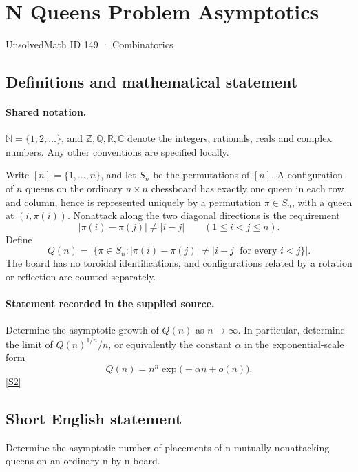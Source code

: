 \documentclass[11pt]{article}
\newcommand{\sref}[2]{\hyperlink{source:#1:#2}{[S#2]}}
\begin{document}
\setcounter{section}{148}
\section{N Queens Problem Asymptotics}\label{149}
{\small\sffamily UnsolvedMath ID 149 · Combinatorics}
\subsection{Definitions and mathematical statement}

\paragraph{Shared notation.}$\mathbb N=\{1,2,\ldots\}$, and $\mathbb Z,\mathbb Q,\mathbb R,\mathbb C$ denote the integers, rationals, reals and complex numbers. Any other conventions are specified locally.


Write $[n]=\{1,\ldots,n\}$, and let $S_n$ be the permutations of $[n]$. A configuration of $n$ queens on the ordinary $n\times n$ chessboard has exactly one queen in each row and column, hence is represented uniquely by a permutation $\pi\in S_n$, with a queen at $(i,\pi(i))$. Nonattack along the two diagonal directions is the requirement
\[
 |\pi(i)-\pi(j)|\ne |i-j|\qquad(1\leq i<j\leq n).
\]
Define
\[
 Q(n)=\bigl|\{\pi\in S_n:|\pi(i)-\pi(j)|\ne|i-j|\text{ for every }i<j\}\bigr|.
\]
The board has no toroidal identifications, and configurations related by a rotation or reflection are counted separately.
\paragraph{Statement recorded in the supplied source.}
Determine the asymptotic growth of $Q(n)$ as $n\to\infty$. In particular, determine the limit of $Q(n)^{1/n}/n$, or equivalently the constant $\alpha$ in the exponential-scale form
\[
 Q(n)=n^n\exp\bigl(-\alpha n+o(n)\bigr).
\] \sref{149}{2}
\subsection{Short English statement}
Determine the asymptotic number of placements of n mutually nonattacking queens on an ordinary n-by-n board.
\end{document}
